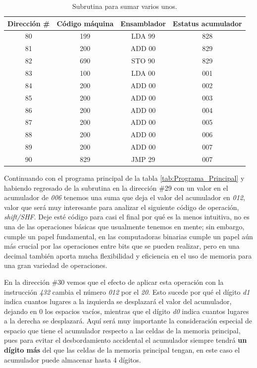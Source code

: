 \documentclass[letterpaper,12pt,oneside]{book}
\begin{document}
	\begin{table}[h]
	  \centering
	  \begin{tabular}{|c|c|c|c|}
	    \hline
    	\textbf{Dirección \#} & \textbf{Código máquina} & \textbf{Ensamblador} & \textbf{Estatus acumulador} \\
	    \hline
	     80 & 199 & LDA 99 & 828 \\
	     81 & 200 & ADD 00 & 829 \\
	     82 & 690 & STO 90 & 829 \\
	     83 & 100 & LDA 00 & 001 \\
	     84 & 200 & ADD 00 & 002 \\
	     85 & 200 & ADD 00 & 003 \\
	     86 & 200 & ADD 00 & 004 \\
	     87 & 200 & ADD 00 & 005 \\
	     88 & 200 & ADD 00 & 006 \\
	     89 & 200 & ADD 00 & 007 \\
	     90 & 829 & JMP 29 & 007 \\
	    \hline
	  \end{tabular}
	  \caption{Subrutina para sumar varios unos.}
	  \label{tab:subrutina}
	\end{table}
	
	
	Continuando con el programa principal de la tabla \ref{tab:Programa_Principal} y habiendo regresado de la subrutina en
	la dirección \#29 con
	un valor en el acumulador de \textit{006} tenemos una suma que deja el valor del acumulador en \textit{012}, valor que será muy
	interesante para analizar el siguiente código de operación, \textit{shift/SHF}. Deje esté código para  casi el final 	
	por qué
	es la menos intuitiva, no es una de las operaciones básicas que usualmente tenemos en mente; sin embargo, cumple un papel fundamental, en las 
	computadoras binarias cumple un papel aún más crucial por las operaciones entre bits que se pueden realizar, pero en una decimal
	también aporta mucha flexibilidad y eficiencia en el uso de memoria para una gran variedad de operaciones.
	
	En la dirección \#30 vemos que el efecto de aplicar esta operación con la instrucción \textit{432} cambia el número \textit{012} por
	el \textit{20}. Esto sucede por qué el dígito \textit{d1} indica cuantos lugares a la izquierda se desplazará el valor
	del acumulador, dejando en 0 los espacios vacíos, mientras que el dígito \textit{d0} indica cuantos lugares a la derecha se desplazará.
	Aquí será muy importante la consideración especial de espacio que tiene el acumulador respecto a las celdas de la memoria principal, pues
	para evitar el desbordamiento accidental el acumulador siempre tendrá \textbf{un dígito más} del que las celdas de la memoria principal tengan,
	en este caso el acumulador puede almacenar hasta 4 dígitos.
	
\end{document}
